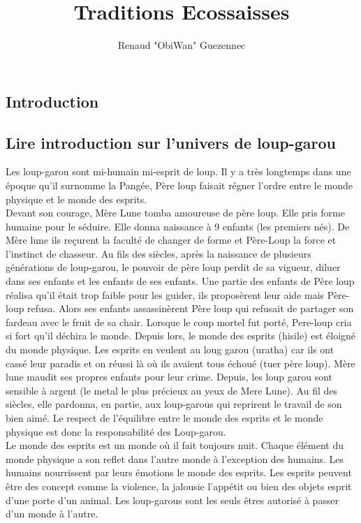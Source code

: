 \documentclass[oneside,12pt]{book}
\title{Traditions Ecossaisses}
\author{Renaud "ObiWan" Guezennec}
\date{}
\begin{document}
\maketitle \clearpage
\tableofcontents \clearpage

\begin{flushleft}
    \chapter{Introduction}
        \section{Lire introduction sur l'univers de loup-garou}
       Les loup-garou sont mi-humain mi-esprit de loup. Il y a très longtemps dans une époque qu'il surnomme la Pangée, Père loup faisait régner l'ordre entre le monde physique et le monde des esprits.\\ Devant son courage, Mère Lune tomba amoureuse de père loup. Elle pris forme humaine pour le séduire. Elle donna naissance à 9 enfants (les premiers nés). De Mère lune ils reçurent la faculté de changer de forme et Père-Loup la force et l'instinct de chasseur. Au fils des siècles, après la naissance de plusieurs générations de loup-garou, le pouvoir de père loup perdit de sa vigueur, diluer dans ses enfants et les enfants de ses enfants. Une partie des enfants de Père loup réalisa qu'il était trop faible pour les guider, ils proposèrent leur aide mais Père-loup refusa. Alors ses enfants assassinèrent Père loup  qui refusait de partager son fardeau avec le fruit de sa chair. Lorsque le coup mortel fut porté, Pere-loup cria si fort qu'il déchira le monde. Depuis lors, le monde des esprits (hisile) est éloigné du monde physique. Les esprits en veulent au loug garou (uratha) car ils ont cassé leur paradis et on réussi là où ils avaient tous échoué (tuer père loup). Mère lune maudit ses propres enfants pour leur crime. Depuis, les loup garou sont sensible à argent (le metal le plus précieux au yeux de Mere Lune). Au fil des siècles, elle pardonna, en partie, aux loup-garous qui reprirent le travail de son bien aimé. Le respect de l'équilibre entre le monde des esprits et le monde physique est donc la responsabilité des Loup-garou. \\
Le monde des esprits est un monde où il fait toujours nuit. Chaque élément du monde physique a son reflet dans l'autre monde à l'exception des humains. Les humains nourrissent par leurs émotions le monde des esprits. Les esprits peuvent être des concept comme la violence, la jalousie l'appétit ou bien des objets esprit d'une porte d'un animal. Les loup-garous sont les seuls êtres autorisé à passer d'un monde à l'autre. \\

\end{flushleft}
\end{document}
